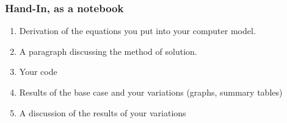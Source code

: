 \documentclass[12pt]{article}
\begin{document}
\subsubsection*{Hand-In, as a notebook}
\begin{enumerate}
\item Derivation of the equations you put into your computer model.
\item A paragraph discussing the method of solution.
\item Your code
\item Results of the base case and your variations (graphs, summary tables)
\item A discussion of the results of your variations
\end{enumerate}
\end{document}
